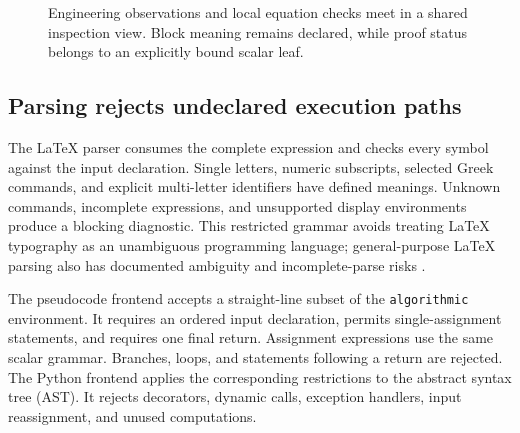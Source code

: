 \begin{figure}[t]
\centering
{}
\caption{Engineering observations and local equation checks meet in a shared inspection view. Block meaning remains declared, while proof status belongs to an explicitly bound scalar leaf.}
\label{fig:pipeline}
\end{figure}

\subsection{Parsing rejects undeclared execution paths}
The LaTeX parser consumes the complete expression and checks every symbol against the input declaration. Single letters, numeric subscripts, selected Greek commands, and explicit multi-letter identifiers have defined meanings. Unknown commands, incomplete expressions, and unsupported display environments produce a blocking diagnostic. This restricted grammar avoids treating LaTeX typography as an unambiguous programming language; general-purpose LaTeX parsing also has documented ambiguity and incomplete-parse risks \citep{SympyParsing2026}.

The pseudocode frontend accepts a straight-line subset of the \texttt{algorithmic} environment. It requires an ordered input declaration, permits single-assignment statements, and requires one final return. Assignment expressions use the same scalar grammar. Branches, loops, and statements following a return are rejected. The Python frontend applies the corresponding restrictions to the abstract syntax tree (AST). It rejects decorators, dynamic calls, exception handlers, input reassignment, and unused computations.

